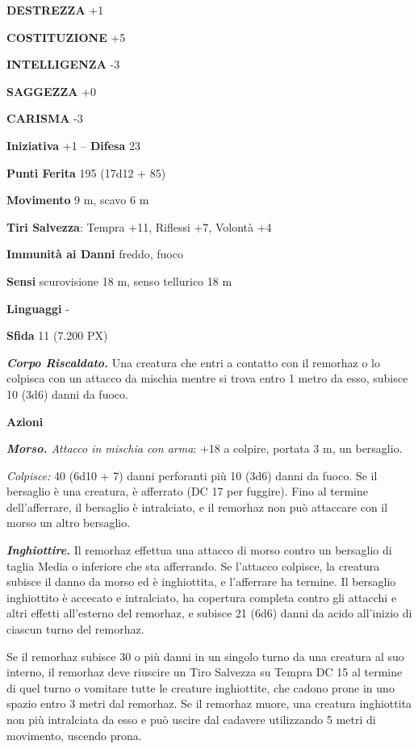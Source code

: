 \begin{multicols}{2}
	\textbf{DESTREZZA} +1

	\textbf{COSTITUZIONE} +5

	\textbf{INTELLIGENZA} -3

	\textbf{SAGGEZZA} +0

	\textbf{CARISMA} -3

	\textbf{Iniziativa} +1 -- \textbf{Difesa} 23

	\textbf{Punti Ferita} 195 (17d12 + 85)

	\textbf{Movimento} 9 m, scavo 6 m

	\textbf{Tiri Salvezza}: Tempra +11, Riflessi +7, Volontà +4

	\textbf{Immunità ai Danni} freddo, fuoco

	\textbf{Sensi} scurovisione 18 m, senso tellurico 18 m

	\textbf{Linguaggi} -

	\textbf{Sfida} 11 (7.200 PX)

	\textit{\textbf{Corpo Riscaldato.}} Una creatura che entri a contatto con il remorhaz o lo colpisca con un attacco da mischia mentre si trova entro 1 metro da esso, subisce 10 (3d6) danni da fuoco.

	\textbf{Azioni}

	\textit{\textbf{Morso.} Attacco in mischia con arma}: +18 a colpire, portata 3 m, un bersaglio.

	\textit{Colpisce:} 40 (6d10 + 7) danni perforanti più 10 (3d6) danni da fuoco. Se il bersaglio è una creatura, è afferrato (DC 17 per fuggire). Fino al termine dell'afferrare, il bersaglio è intralciato, e il remorhaz non può attaccare con il morso un altro bersaglio.

	\textit{\textbf{Inghiottire.}} Il remorhaz effettua una attacco di morso contro un bersaglio di taglia Media o inferiore che sta afferrando. Se l'attacco colpisce, la creatura subisce il danno da morso ed è inghiottita, e l'afferrare ha termine. Il bersaglio inghiottito è accecato e intralciato, ha copertura completa contro gli attacchi e altri effetti all'esterno del remorhaz, e subisce 21 (6d6) danni da acido all'inizio di ciascun turno del remorhaz.

	Se il remorhaz subisce 30 o più danni in un singolo turno da una creatura al suo interno, il remorhaz deve riuscire un Tiro Salvezza su Tempra DC 15 al termine di quel turno o vomitare tutte le creature inghiottite, che cadono prone in uno spazio entro 3 metri dal remorhaz. Se il remorhaz muore, una creatura inghiottita non  più intralciata da esso e può uscire dal cadavere utilizzando 5 metri di movimento, uscendo prona.


\end{multicols}
